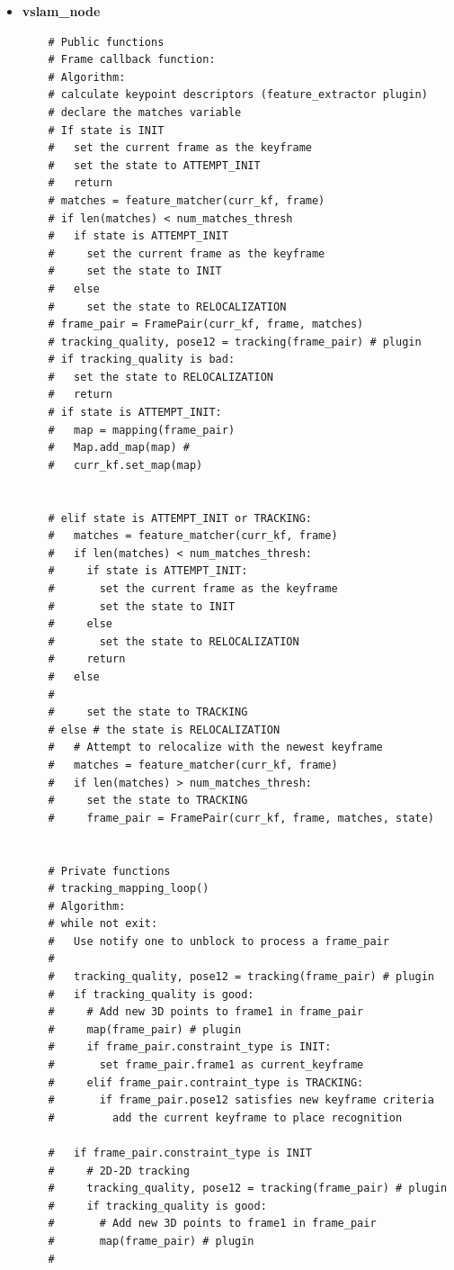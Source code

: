 \begin{itemize}
  \item{\textbf{vslam\_node}} 
  \begin{verbatim}
    # Public functions
    # Frame callback function:
    # Algorithm:
    # calculate keypoint descriptors (feature_extractor plugin)
    # declare the matches variable
    # If state is INIT
    #   set the current frame as the keyframe
    #   set the state to ATTEMPT_INIT
    #   return
    # matches = feature_matcher(curr_kf, frame)
    # if len(matches) < num_matches_thresh
    #   if state is ATTEMPT_INIT
    #     set the current frame as the keyframe
    #     set the state to INIT
    #   else
    #     set the state to RELOCALIZATION
    # frame_pair = FramePair(curr_kf, frame, matches)
    # tracking_quality, pose12 = tracking(frame_pair) # plugin
    # if tracking_quality is bad:
    #   set the state to RELOCALIZATION
    #   return
    # if state is ATTEMPT_INIT:
    #   map = mapping(frame_pair)
    #   Map.add_map(map) # 
    #   curr_kf.set_map(map)


    # elif state is ATTEMPT_INIT or TRACKING:
    #   matches = feature_matcher(curr_kf, frame)
    #   if len(matches) < num_matches_thresh:
    #     if state is ATTEMPT_INIT:
    #       set the current frame as the keyframe
    #       set the state to INIT
    #     else
    #       set the state to RELOCALIZATION
    #     return
    #   else 
    #     
    #     set the state to TRACKING
    # else # the state is RELOCALIZATION
    #   # Attempt to relocalize with the newest keyframe
    #   matches = feature_matcher(curr_kf, frame)
    #   if len(matches) > num_matches_thresh:
    #     set the state to TRACKING
    #     frame_pair = FramePair(curr_kf, frame, matches, state)
    

    # Private functions
    # tracking_mapping_loop()
    # Algorithm:
    # while not exit:
    #   Use notify one to unblock to process a frame_pair
    #   
    #   tracking_quality, pose12 = tracking(frame_pair) # plugin
    #   if tracking_quality is good:
    #     # Add new 3D points to frame1 in frame_pair
    #     map(frame_pair) # plugin
    #     if frame_pair.constraint_type is INIT:
    #       set frame_pair.frame1 as current_keyframe
    #     elif frame_pair.contraint_type is TRACKING:
    #       if frame_pair.pose12 satisfies new keyframe criteria
    #         add the current keyframe to place recognition

    #   if frame_pair.constraint_type is INIT
    #     # 2D-2D tracking 
    #     tracking_quality, pose12 = tracking(frame_pair) # plugin
    #     if tracking_quality is good:
    #       # Add new 3D points to frame1 in frame_pair
    #       map(frame_pair) # plugin
    #     



\end{verbatim}
\end{itemize}
